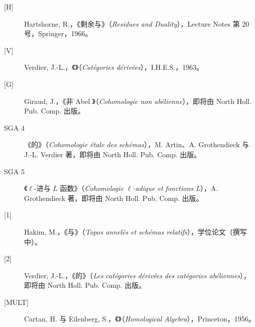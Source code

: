 \begin{description}
\item[{[H]}] Hartshorne, R.，《剩余与》（\textit{Residues and Duality}），Lecture Notes 第 20 号，Springer，1966。
\item[{[V]}] Verdier, J.-L.，《》（\textit{Catégories dérivées}），I.H.E.S.，1963。
\item[{[G]}] Giraud, J.，《非 Abel 》（\textit{Cohomologie non abélienne}），即将由 North Holl. Pub. Comp. 出版。
\item[{SGA 4}] 《的》（\textit{Cohomologie étale des schémas}），M. Artin、A. Grothendieck 与 J.-L. Verdier 著，即将由 North Holl. Pub. Comp. 出版。
\item[{SGA 5}] 《$\ell$-进与 $L$ 函数》（\textit{Cohomologie $\ell$-adique et fonctions L}），A. Grothendieck 著，即将由 North Holl. Pub. Comp. 出版。
\item[{[1]}] Hakim, M.，《与》（\textit{Topos annelés et schémas relatifs}），学位论文（撰写中）。
\item[{[2]}] Verdier, J.-L.，《的》（\textit{Les catégories dérivées des catégories abéliennes}），即将由 North Holl. Pub. Comp. 出版。
\item[{[MULT]}] Cartan, H. 与 Eilenberg, S.，《》（\textit{Homological Algebra}），Princeton，1956。
\end{description}
